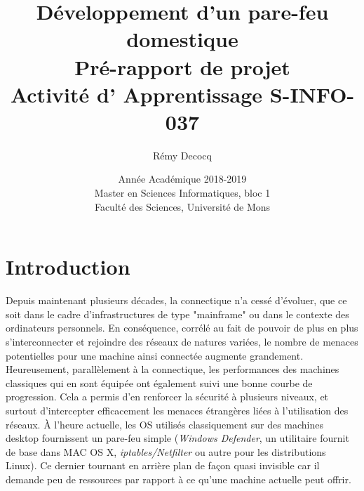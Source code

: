 \documentclass[]{article}
\begin{document}
\title{
\vspace{1.6cm}
{\Huge Développement d'un pare-feu domestique}\\
\vspace{0.5cm}
{\Huge Pré-rapport de projet}\\
\vspace{0.2cm}
{\large Activité d' Apprentissage \textsf{S-INFO-037}}\\
}



\author{
\vspace{0.9cm}
\huge{Rémy Decocq}
}

\date{
\vspace{8.5cm}
Année Académique 2018-2019\\
Master en Sciences Informatiques, bloc 1\\
Faculté des Sciences, Université de Mons}

\maketitle          

\thispagestyle{empty}   

\newpage

\tableofcontents
\newpage

\section*{Introduction}

Depuis maintenant plusieurs décades, la connectique n'a cessé d'évoluer, que ce soit dans le cadre d'infrastructures de type "mainframe" ou dans le contexte des ordinateurs personnels. En conséquence, corrélé au fait de pouvoir de plus en plus s'interconnecter et rejoindre des réseaux de natures variées, le nombre de menaces potentielles pour une machine ainsi connectée augmente grandement. Heureusement, parallèlement à la connectique, les performances des machines classiques qui en sont équipée ont également suivi une bonne courbe de progression. Cela a permis d'en renforcer la sécurité à plusieurs niveaux, et surtout d'intercepter efficacement les menaces étrangères liées à l'utilisation des réseaux. À l'heure actuelle, les OS utilisés classiquement sur des machines desktop fournissent un pare-feu simple (\textit{Windows Defender}, un utilitaire fournit de base dans MAC OS X, \textit{iptables/Netfilter} ou autre pour les distributions Linux). Ce dernier tournant en arrière plan de façon quasi invisible car il demande peu de ressources par rapport à ce qu'une machine actuelle peut offrir.\\
\end{document}
